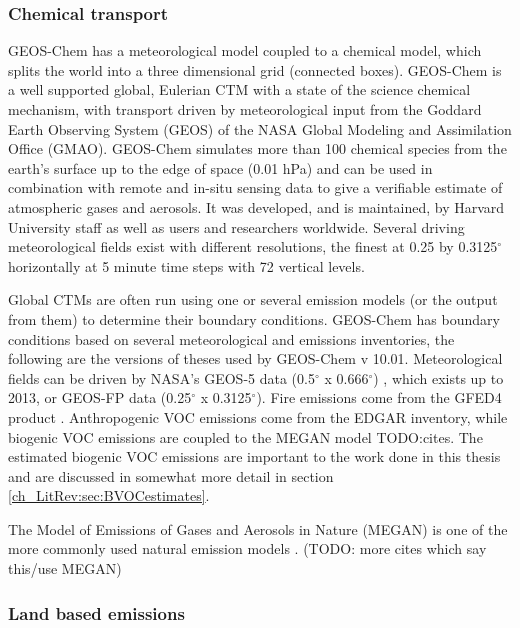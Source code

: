     \subsubsection{Chemical transport} %
      GEOS-Chem has a meteorological model coupled to a chemical model, which splits the world into a three dimensional grid (connected boxes).
      GEOS-Chem is a well supported global, Eulerian CTM with a state of the science chemical mechanism, with transport driven by meteorological input from the Goddard Earth Observing System (GEOS) of the NASA Global Modeling and Assimilation Office (GMAO).
      GEOS-Chem simulates more than 100 chemical species from the earth's surface up to the edge of space (0.01 hPa) and can be used in combination with remote and in-situ sensing data to give a verifiable estimate of atmospheric gases and aerosols.
      It was developed, and is maintained, by Harvard University staff as well as users and researchers worldwide. 
      Several driving meteorological fields exist with different resolutions, the finest at 0.25 by 0.3125$^\circ$ horizontally at 5 minute time steps with 72 vertical levels.
      
      Global CTMs are often run using one or several emission models (or the output from them) to determine their boundary conditions.
      GEOS-Chem has boundary conditions based on several meteorological and emissions inventories, the following are the versions of theses used by GEOS-Chem v 10.01. 
      Meteorological fields can be driven by NASA's GEOS-5 data (0.5$^{\circ}$ x 0.666$^{\circ}$) \citep{Chen2009}, which exists up to 2013, or GEOS-FP data (0.25$^{\circ}$ x 0.3125$^{\circ}$).
      Fire emissions come from the GFED4 product \citep{Giglio2013}. 
      Anthropogenic VOC emissions come from the EDGAR inventory, while biogenic VOC emissions are coupled to the MEGAN model TODO:cites.
      The estimated biogenic VOC emissions are important to the work done in this thesis and are discussed in somewhat more detail in section \ref{ch_LitRev:sec:BVOCestimates}.
      
      The Model of Emissions of Gases and Aerosols in Nature (MEGAN) is one of the more commonly used natural emission models \citep{Monks2015}. (TODO: more cites which say this/use MEGAN)
      
    \subsubsection{Land based emissions} %
      
